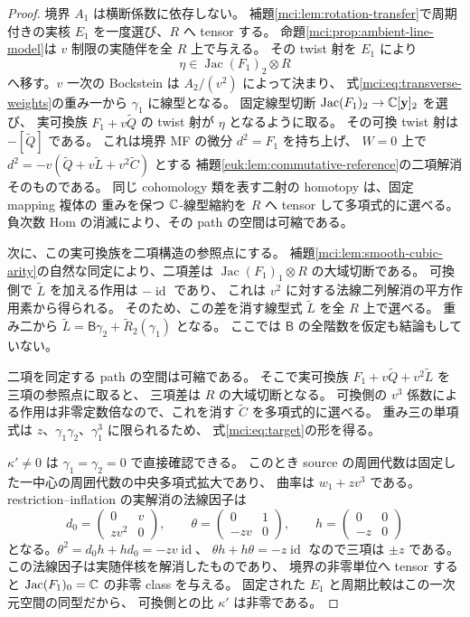 \begin{proof}
境界 $A_1$ は横断係数に依存しない。
補題\ref{mci:lem:rotation-transfer}で周期付きの実核 $E_1$ を一度選び、$R$ へ tensor する。
命題\ref{mci:prop:ambient-line-model}は $v$ 制限の実随伴を全 $R$ 上で与える。
その twist 射を $E_1$ により
\[
       \eta\in\operatorname{Jac}(F_1)_2\otimes R
\]
へ移す。$v$ 一次の Bockstein は $A_2/(v^2)$ によって決まり、
式\eqref{mci:eq:transverse-weights}の重み一から $\gamma_1$ に線型となる。
固定線型切断
$\operatorname{Jac}(F_1)_2\to\mathbb C[\mathbf y]_2$ を選び、
実可換族 $F_1+v\widetilde Q$ の twist 射が $\eta$ となるように取る。
その可換 twist 射は $-[\widetilde Q]$ である。
これは境界 MF の微分 $d^2=F_1$ を持ち上げ、
$W=0$ 上で $d^2=-v(\widetilde Q+v\widetilde L+v^2\widetilde C)$ とする
補題\ref{euk:lem:commutative-reference}の二項解消そのものである。
同じ cohomology 類を表す二射の homotopy は、固定 mapping 複体の
重みを保つ $\mathbb C$-線型縮約を $R$ へ tensor して多項式的に選べる。
負次数 Hom の消滅により、その path の空間は可縮である。

次に、この実可換族を二項構造の参照点にする。
補題\ref{mci:lem:smooth-cubic-arity}の自然な同定により、二項差は
$\operatorname{Jac}(F_1)_1\otimes R$ の大域切断である。
可換側で $\widetilde L$ を加える作用は $-\operatorname{id}$ であり、
これは $v^2$ に対する法線二列解消の平方作用素から得られる。
そのため、この差を消す線型式 $\widetilde L$ を全 $R$ 上で選べる。
重み二から $\widetilde L=\mathsf B\gamma_2+\widetilde R_2(\gamma_1)$ となる。
ここでは $\mathsf B$ の全階数を仮定も結論もしていない。

二項を同定する path の空間は可縮である。
そこで実可換族 $F_1+v\widetilde Q+v^2\widetilde L$ を三項の参照点に取ると、
三項差は $R$ の大域切断となる。
可換側の $v^3$ 係数による作用は非零定数倍なので、これを消す
$\widetilde C$ を多項式的に選べる。
重み三の単項式は $z$、$\gamma_1\gamma_2$、$\gamma_1^3$ に限られるため、
式\eqref{mci:eq:target}の形を得る。

$\kappa'\ne0$ は $\gamma_1=\gamma_2=0$ で直接確認できる。
このとき source の周囲代数は固定した一中心の周囲代数の中央多項式拡大であり、
曲率は $w_1+zv^3$ である。
restriction--inflation の実解消の法線因子は
\[
 d_0=\begin{pmatrix}0&v\\zv^2&0\end{pmatrix},\qquad
 \theta=\begin{pmatrix}0&1\\-zv&0\end{pmatrix},\qquad
 h=\begin{pmatrix}0&0\\-z&0\end{pmatrix}
\]
となる。$\theta^2=d_0h+hd_0=-zv\operatorname{id}$、
$\theta h+h\theta=-z\operatorname{id}$ なので三項は $\pm z$ である。
この法線因子は実随伴核を解消したものであり、
境界の非零単位へ tensor すると
$\operatorname{Jac}(F_1)_0=\mathbb C$ の非零 class を与える。
固定された $E_1$ と周期比較はこの一次元空間の同型だから、
可換側との比 $\kappa'$ は非零である。


\end{proof}
